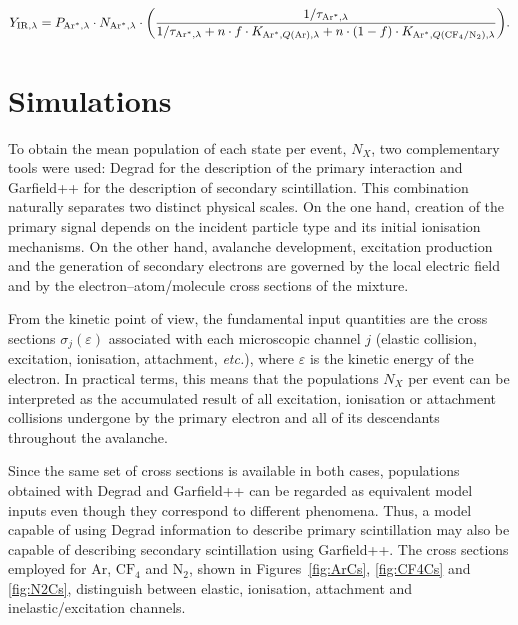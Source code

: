 \documentclass[12pt,a4paper]{article}
\newcommand{\N}{\mathrm{N}}
\newcommand{\Ar}{\mathrm{Ar}}
\newcommand{\CF}{\mathrm{CF}}
\begin{document}
\begin{equation}
    Y_{\mathrm{IR},\lambda} = P_{\Ar^*,\lambda} \cdot N_{\Ar^*,\lambda}  \cdot \pqty{\frac{1 / \tau_{\Ar^*,\lambda}}{1 / \tau_{\Ar^*,\lambda} + n \cdot f \cdot  K_{\Ar^*, Q(\Ar), \lambda} + n \cdot(1-f) \cdot  K_{\Ar^*, Q(\CF_4/\N_2), \lambda}} }.
\end{equation}

\section{Simulations}

To obtain the mean population of each state per event, $N_X$, two complementary tools were used: Degrad for the description of the primary interaction and Garfield++ for the description of secondary scintillation. This combination naturally separates two distinct physical scales. On the one hand, creation of the primary signal depends on the incident particle type and its initial ionisation mechanisms. On the other hand, avalanche development, excitation production and the generation of secondary electrons are governed by the local electric field and by the electron--atom/molecule cross sections of the mixture.

From the kinetic point of view, the fundamental input quantities are the cross sections $\sigma_j(\varepsilon)$ associated with each microscopic channel $j$ (elastic collision, excitation, ionisation, attachment, \emph{etc.}), where $\varepsilon$ is the kinetic energy of the electron. In practical terms, this means that the populations $N_X$ per event can be interpreted as the accumulated result of all excitation, ionisation or attachment collisions undergone by the primary electron and all of its descendants throughout the avalanche.

Since the same set of cross sections is available in both cases, populations obtained with Degrad and Garfield++ can be regarded as equivalent model inputs even though they correspond to different phenomena. Thus, a model capable of using Degrad information to describe primary scintillation may also be capable of describing secondary scintillation using Garfield++. The cross sections employed for $\Ar$, $\CF_4$ and $\N_2$, shown in Figures~\ref{fig:ArCs}, \ref{fig:CF4Cs} and \ref{fig:N2Cs}, distinguish between elastic, ionisation, attachment and inelastic/excitation channels.
\end{document}
